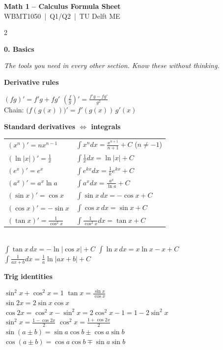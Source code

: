 \documentclass[10pt]{article}
\newcommand{\sect}[2]{%
  \par\vspace{12pt}\noindent                      %
  \colorbox{#1}{\parbox{\dimexpr\columnwidth-2\fboxsep}{\color{white}\bfseries #2}}%
  \par\vspace{4pt}}                               %
\newcommand{\sub}[1]{\par\vspace{7pt}\textbf{#1}\par\vspace{2pt}}  %
\newcommand{\expl}[1]{{\color{gray!80!black}\itshape #1}\par}
\begin{document}
\begin{center}
  {\Large\bfseries Math 1 – Calculus Formula Sheet}\\[-1pt]
  {\small WBMT1050 \,|\, Q1/Q2 \,|\, TU Delft ME}
\end{center}
\vspace{-6pt}

\raggedcolumns                                     %
\begin{multicols}{2}
\small

\sect{cBasic}{0. Basics}
\expl{The tools you need in every other section. Know these without thinking.}
\sub{Derivative rules}
$(fg)'=f'g+fg'$ \quad $\left(\frac fg\right)'=\frac{f'g-fg'}{g^2}$\\
Chain: $\big(f(g(x))\big)'=f'(g(x))\,g'(x)$

\sub{Standard derivatives $\Leftrightarrow$ integrals}
\renewcommand{\arraystretch}{1.15}
\begin{tabular}{@{}ll@{}}
$(x^n)'=nx^{n-1}$ & $\int x^n dx=\frac{x^{n+1}}{n+1}+C$ \; ($n\neq-1$)\\
$(\ln|x|)'=\frac1x$ & $\int \frac1x dx=\ln|x|+C$\\
$(e^{x})'=e^{x}$ & $\int e^{kx}dx=\frac1k e^{kx}+C$\\
$(a^x)'=a^x\ln a$ & $\int a^x dx=\frac{a^x}{\ln a}+C$\\
$(\sin x)'=\cos x$ & $\int \sin x\,dx=-\cos x+C$\\
$(\cos x)'=-\sin x$ & $\int \cos x\,dx=\sin x+C$\\
$(\tan x)'=\frac{1}{\cos^2x}$ & $\int \frac{1}{\cos^2 x}dx=\tan x+C$\\
\end{tabular}\\
$\int \tan x\,dx=-\ln|\cos x|+C$ \quad $\int \ln x\,dx = x\ln x - x + C$\\
$\int \frac{1}{ax+b}dx=\frac1a\ln|ax+b|+C$

\sub{Trig identities}
$\sin^2x+\cos^2x=1$ \quad $\tan x=\frac{\sin x}{\cos x}$\\
$\sin 2x=2\sin x\cos x$\\
$\cos 2x=\cos^2x-\sin^2x=2\cos^2x-1=1-2\sin^2x$\\
$\sin^2x=\frac{1-\cos2x}{2}$ \quad $\cos^2x=\frac{1+\cos2x}{2}$\\
$\sin(a\pm b)=\sin a\cos b\pm\cos a\sin b$\\
$\cos(a\pm b)=\cos a\cos b\mp\sin a\sin b$


\end{multicols}
\end{document}
